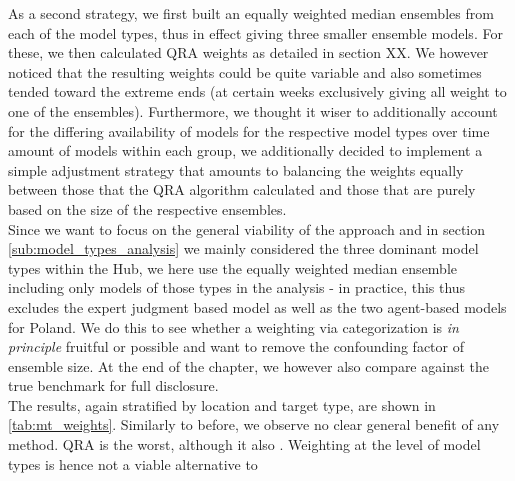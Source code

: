 As a second strategy, we first built an equally weighted median ensembles from each of the model types, thus in effect giving three smaller ensemble models. For these, we then calculated QRA weights as detailed in section XX. We however noticed that the resulting weights could be quite variable and also sometimes tended toward the extreme ends (at certain weeks exclusively giving all weight to one of the ensembles). Furthermore, we thought it wiser to additionally account for the differing availability of models for the respective model types over time amount of models within each group, we additionally decided to implement a simple adjustment strategy that amounts to balancing the weights equally between those that the QRA algorithm calculated and those that are purely based on the size of the respective ensembles.\\
Since we want to focus on the general viability of the approach and in section \ref{sub:model_types_analysis} we mainly considered the three dominant model types within the Hub, we here use the equally weighted median ensemble including only models of those types in the analysis - in practice, this thus excludes the expert judgment based model as well as the two agent-based models for Poland. We do this to see whether a weighting via categorization is \textit{in principle} fruitful or possible and want to remove the confounding factor of ensemble size. At the end of the chapter, we however also compare against the true benchmark for full disclosure. \\ 
The results, again stratified by location and target type, are shown in \ref{tab:mt_weights}. Similarly to before, we observe no clear general benefit of any method. QRA is the worst, although it also . Weighting at the level of model types is hence not a viable alternative to 
